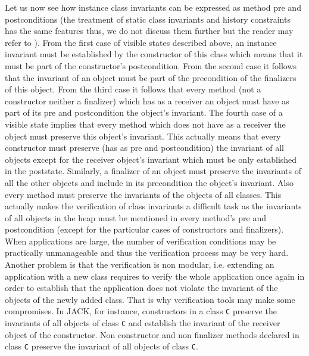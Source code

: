         Let us now see how instance class invariants   can be expressed as 
	method pre and postconditions (the treatment of static class invariants and history constraints has the same features thus, we do not discuss
       them further but the reader may refer to \cite{JMLRefMan}). From the first case of visible states described above, an instance invariant  must
	be established by the constructor of this class which means that it must be part of the constructor's postcondition. 
	From the  second case it follows that the invariant of an object must be part of the precondition of the finalizers of this object.
	From the third case it follows that every method (not a constructor neither a finalizer) which has as a receiver an object
	must have as part of its pre and postcondition the object's invariant. The fourth case of a visible state implies that every method which does not have
	as a receiver the object must preserve this object's invariant.
	This actually means that every constructor must preserve  (has as pre and postcondition)  the invariant of
	all objects except for the receiver object's invariant which must be only established
	in the poststate. Similarly, a finalizer of an object must preserve the invariants of all the other objects and include in its precondition 
	the object's invariant. Also every method must preserve
	the invariants of the objects of all classes.
	This actually makes the verification of class invariants a difficult task as the invariants of all objects in 
	the heap must be mentioned in every method's pre and postcondition (except for the particular cases of constructors and finalizers).  
	When applications are large, the number of verification conditions may be  practically unmanageable and thus the verification process may be very hard.
	Another problem is that the verification is non modular, i.e. extending an application with a new class requires to verify the whole application once again 
	in order to establish that the application does not violate the invariant of the objects of the newly added class.
	That is why verification tools may make some compromises.  
	In JACK, for instance, constructors in a class \texttt{C} preserve the invariants of all objects of class \texttt{C} and establish the invariant of the receiver
	object of the constructor. Non constructor and non finalizer methods declared in class \texttt{C} preserve the invariant of all objects of class \texttt{C}.   
	 
